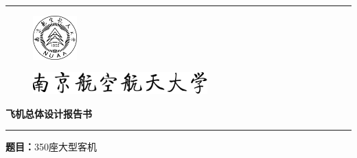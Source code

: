 \begin{titlepage}
    \centering


    \rule{\textwidth}{1pt}   %


    \begin{figure}[H]
    \centering
    \includegraphics[width=0.15\textwidth]{logo/nuaa-logo-black.pdf}
    \end{figure}
    
    \begin{figure}[H]
    \centering
    \includegraphics[width=0.6\textwidth]{logo/nuaa-jianqi.pdf}
    \end{figure}
    
    \vspace{0.02\textheight}
    
    {\Huge \textbf{飞机总体设计报告书}}
    

    \vspace{0.005\textheight}   %

    \rule{0.83\textwidth}{0.4pt}  %

    \vspace{0.02\textheight}  %


    {\huge \textbf{题目：}350座大型客机}
    \vspace{0.05\textheight} 
    

\end{titlepage}
